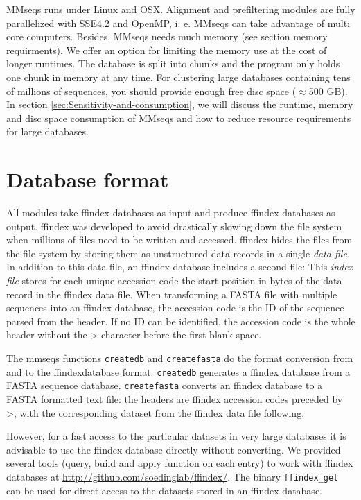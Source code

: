 \documentclass[11pt,a4paper]{report}
\begin{document}
MMseqs runs under Linux and OSX. Alignment and prefiltering modules are
fully parallelized with SSE4.2 and OpenMP, i. e. MMseqs can take advantage of multi core computers. 
Besides, MMseqs needs much memory (see section memory requirments). We offer an option
for limiting the memory use at the cost of longer runtimes. The database
is split into chunks and the program only holds one chunk in memory
at any time. For clustering large databases containing tens of millions
of sequences, you should provide enough free disc space ($\approx$500
GB). In section \ref{sec:Sensitivity-and-consumption}, we will discuss
the runtime, memory and disc space consumption of MMseqs and how to
reduce resource requirements for large databases.

\section{Database format}

All modules take ffindex databases as input and produce ffindex databases
as output. ffindex was developed to avoid drastically slowing down
the file system when millions of files need to be written and accessed.
ffindex hides the files from the file system by storing them as unstructured
data records in a single \emph{data file}. In addition to this data
file, an ffindex database includes a second file: This \emph{index
file }stores for each unique accession code the start position in
bytes of the data record in the ffindex data file. When transforming
a FASTA file with multiple sequences into an ffindex database, the
accession code is the ID of the sequence parsed from the header. If
no ID can be identified, the accession code is the whole header without
the > character before the first blank space.

The mmseqs functions \texttt{createdb} and \texttt{createfasta} 
do the format conversion from and to the ffindexdatabase format. 
\texttt{createdb} generates a ffindex database from a FASTA sequence database. 
\texttt{createfasta} converts an ffindex database to a FASTA formatted text file: the headers are ffindex
accession codes preceded by >, with the corresponding dataset from
the ffindex data file following.

However, for a fast access to the particular datasets in very large
databases it is advisable to use the ffindex database directly without
converting. 
We provided several tools (query, build and apply function on each entry) to work with ffindex databases at \url{http://github.com/soedinglab/ffindex/}.
The binary \texttt{ffindex\_get} can be used for direct access to the datasets stored in an ffindex database.
\end{document}
